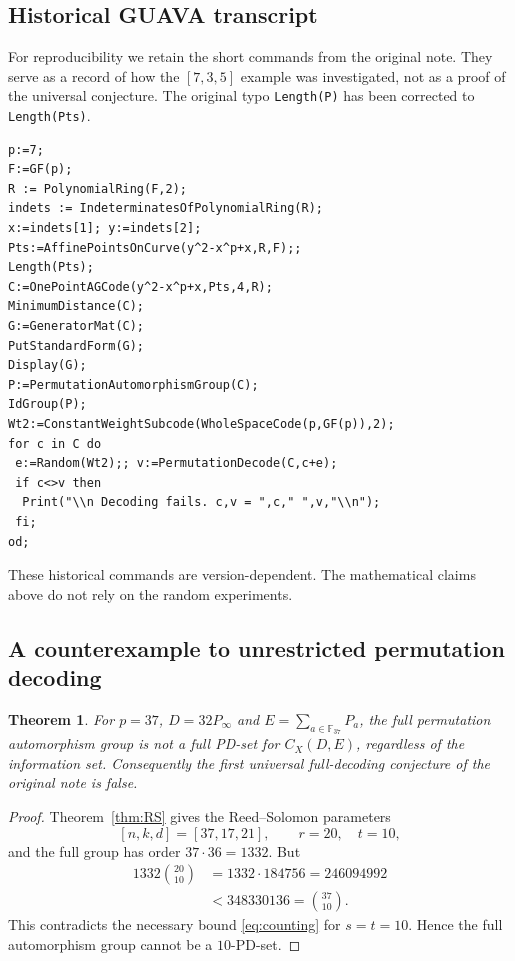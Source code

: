 \documentclass[12pt]{article}
\newtheorem{theorem}{Theorem}[section]
\numberwithin{equation}{section}
\newcommand{\F}{\mathbb{F}}
\begin{document}
\subsection{Historical GUAVA transcript}
\label{subsec:guava}
For reproducibility we retain the short commands from the original note.
They serve as a record of how the $[7,3,5]$ example was investigated,
not as a proof of the universal conjecture.  The original typo
\texttt{Length(P)} has been corrected to \texttt{Length(Pts)}.
\begin{verbatim}
p:=7;
F:=GF(p);
R := PolynomialRing(F,2);
indets := IndeterminatesOfPolynomialRing(R);
x:=indets[1]; y:=indets[2];
Pts:=AffinePointsOnCurve(y^2-x^p+x,R,F);;
Length(Pts);
C:=OnePointAGCode(y^2-x^p+x,Pts,4,R);
MinimumDistance(C);
G:=GeneratorMat(C);
PutStandardForm(G);
Display(G);
P:=PermutationAutomorphismGroup(C);
IdGroup(P);
Wt2:=ConstantWeightSubcode(WholeSpaceCode(p,GF(p)),2);
for c in C do
 e:=Random(Wt2);; v:=PermutationDecode(C,c+e);
 if c<>v then
  Print("\\n Decoding fails. c,v = ",c," ",v,"\\n");
 fi;
od;
\end{verbatim}
These historical commands are version-dependent.  The mathematical
claims above do not rely on the random experiments.

\subsection{A counterexample to unrestricted permutation decoding}
\begin{theorem}\label{thm:counter-RS}
For $p=37$, $D=32P_\infty$ and
$E=\sum_{a\in\F_{37}}P_a$, the full permutation
automorphism group is \emph{not} a full PD-set for
$C_X(D,E)$, regardless of the information set.
Consequently the first universal full-decoding conjecture
of the original note is false.
\end{theorem}
\begin{proof}
Theorem~\ref{thm:RS} gives the Reed--Solomon parameters
\[
[n,k,d]=[37,17,21],\qquad r=20,\quad t=10,
\]
and the full group has order $37\cdot36=1332$.
But
\begin{align*}
1332\binom{20}{10}
 &=1332\cdot184756=246094992\\
 &<348330136=\binom{37}{10}.
\end{align*}
This contradicts the necessary bound
\eqref{eq:counting} for $s=t=10$.  Hence the
full automorphism group cannot be a $10$-PD-set.
\end{proof}
\end{document}
